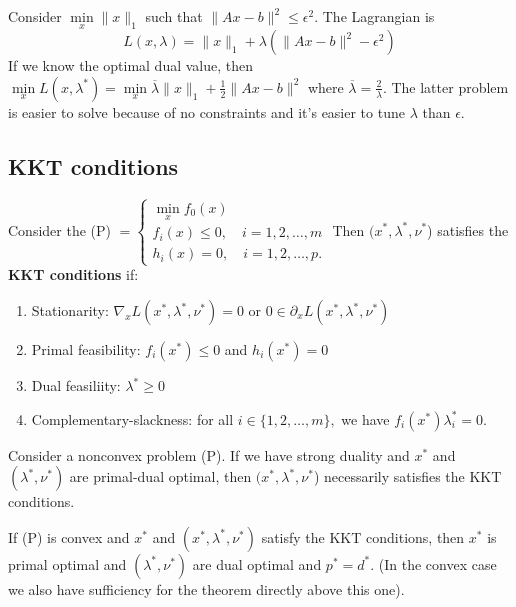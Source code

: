 \begin{exmp}
Consider $\min \limits_x \|x\|_1$ such that $\|Ax-b\|^2 \le \epsilon^2$. The Lagrangian is
\[
L(x,\lambda) = \|x\|_1 + \lambda( \|Ax-b\|^2 - \epsilon^2 )
\]
If we know the optimal dual value, then $\min \limits_x L(x,\lambda^*) = \min \limits_x \overline{\lambda} \|x\|_1 + \frac{1}{2} \|Ax-b\|^2$ where $\overline{\lambda} = \frac{2}{\lambda}$. The latter problem is easier to solve because of no constraints and it's easier to tune $\lambda$ than $\epsilon$.
\end{exmp}

  \subsection{KKT conditions}
  Consider the (P) $=\begin{cases} 
  \min \limits_x f_0(x) \\
  f_i(x) \le 0, \quad i=1,2,\dots,m \\
  h_i(x)=0, \quad i=1,2,\dots,p.
  \end{cases}$ Then $(x^*,\lambda^*,\nu^*$) satisfies the {\bf KKT conditions} if:
  \begin{enumerate}
  \item Stationarity: $\nabla_x L(x^*,\lambda^*,\nu^*)=0$ or $0 \in \partial_x L(x^*,\lambda^*,\nu^*)$
  \item Primal feasibility: $f_i(x^*) \le 0$ and $h_i(x^*)=0$
  \item Dual feasiliity: $\lambda^* \ge 0$
  \item Complementary-slackness: for all $i \in \{1,2,\dots,m\},$ we have $f_i(x^*) \lambda_i^* =0$.
  \end{enumerate}
  
  
  \begin{thrm}
  Consider a nonconvex problem (P). If we have strong duality and $x^*$ and $(\lambda^*,\nu^*)$ are primal-dual optimal, then $(x^*,\lambda^*,\nu^*$) necessarily satisfies the KKT conditions. 
  \end{thrm}
  
  \begin{thrm}
  If (P) is convex and $x^*$ and $(x^*,\lambda^*, \nu^*)$ satisfy the KKT conditions, then $x^*$ is primal optimal and $(\lambda^*,\nu^*)$ are dual optimal and $p^*=d^*$. (In the convex case we also have sufficiency for the theorem directly above this one).
  \end{thrm}
  
